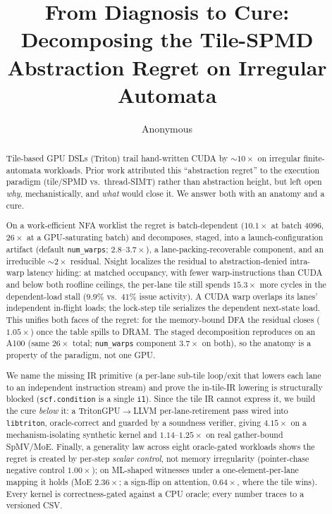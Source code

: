 \documentclass[acmsmall,review,anonymous]{acmart}
\begin{document}
\title{From Diagnosis to Cure: Decomposing the Tile-SPMD Abstraction Regret on Irregular Automata}
\author{Anonymous}
\renewcommand{\shortauthors}{Anonymous}

\begin{abstract}
Tile-based GPU DSLs (Triton) trail hand-written CUDA by ${\sim}10\times$ on irregular finite-automata
workloads. Prior work attributed this ``abstraction regret'' to the execution paradigm (tile/SPMD vs.\
thread-SIMT) rather than abstraction height, but left open \emph{why}, mechanistically, and \emph{what}
would close it. We answer both with an anatomy and a cure.

On a work-efficient NFA worklist the regret is batch-dependent ($10.1\times$ at batch 4096, $26\times$
at a GPU-saturating batch) and decomposes, staged, into a launch-configuration artifact (default
\texttt{num\_warps}; $2.8$--$3.7\times$), a lane-packing-recoverable component, and an irreducible
${\sim}2\times$ residual. Nsight localizes the residual to abstraction-denied intra-warp latency
hiding: at matched occupancy, with fewer warp-instructions than CUDA and below both roofline ceilings,
the per-lane tile still spends $15.3\times$ more cycles in the dependent-load stall ($9.9\%$ vs.\ $41\%$
issue activity). A CUDA warp overlaps its lanes' independent in-flight loads; the lock-step tile
serializes the dependent next-state load. This unifies both faces of the regret: for the memory-bound
DFA the residual closes ($1.05\times$) once the table spills to DRAM. The staged decomposition
reproduces on an A100 (same $26\times$ total; \texttt{num\_warps} component $3.7\times$ on both), so the
anatomy is a property of the paradigm, not one GPU.

We name the missing IR primitive (a per-lane sub-tile loop/exit that lowers each lane to an independent
instruction stream) and prove the in-tile-IR lowering is structurally blocked (\texttt{scf.condition}
is a single \texttt{i1}). Since the tile IR cannot express it, we build the cure \emph{below} it: a
\mbox{TritonGPU$\rightarrow$LLVM} per-lane-retirement pass wired into \texttt{libtriton}, oracle-correct
and guarded by a soundness verifier, giving $4.15\times$ on a mechanism-isolating synthetic kernel and
$1.14$--$1.25\times$ on real gather-bound SpMV/MoE. Finally, a generality law across eight oracle-gated
workloads shows the regret is created by per-step \emph{scalar control}, not memory irregularity
(pointer-chase negative control $1.00\times$); on ML-shaped witnesses under a one-element-per-lane
mapping it holds (MoE $2.36\times$; a sign-flip on attention, $0.64\times$, where the tile wins).
Every kernel is correctness-gated against a CPU oracle; every number traces to a versioned CSV.
\end{abstract}
\end{document}
